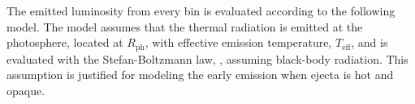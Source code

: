 The emitted luminosity from every bin is evaluated according to the following model. 
%
The model assumes that the thermal radiation is emitted at the photosphere, located at 
$R_{\text{ph}}$, with effective emission temperature, $T_{\text{eff}}$, and 
is evaluated with the Stefan-Boltzmann law, \ie, assuming 
black-body radiation. This assumption is justified 
for modeling the early emission when ejecta is hot and opaque. 
%


